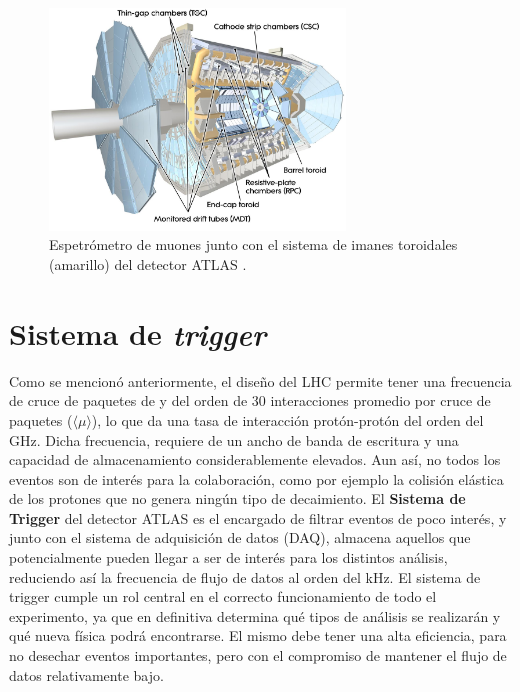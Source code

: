 \begin{figure}
  \centering
  \includegraphics[width=0.7\textwidth]{images/lhc/muon_1.jpg}
  \caption{Espetrómetro de muones junto con el sistema de imanes toroidales (amarillo) del detector ATLAS \cite{Pequenao:1095929}.}
  \label{fig:muon_1}
\end{figure}

\section{Sistema de \textit{trigger}}\label{sec:trigger}

Como se mencionó anteriormente, el diseño del LHC permite tener una frecuencia de cruce de paquetes de  y del orden de 30 interacciones promedio por cruce de paquetes ($\langle \mu \rangle$), lo que da una tasa de interacción protón-protón del orden del GHz. Dicha frecuencia, requiere de un ancho de banda de escritura y una capacidad de almacenamiento considerablemente elevados. Aun así, no todos los eventos son de interés para la colaboración, como por ejemplo la colisión elástica de los protones que no genera ningún tipo de decaimiento. El \textbf{Sistema de Trigger} del detector ATLAS \cite{TRIG-2016-01} es el encargado de filtrar eventos de poco interés, y junto con el sistema de adquisición de datos (DAQ), almacena aquellos que potencialmente pueden llegar a ser de interés para los distintos análisis, reduciendo así la frecuencia de flujo de datos al orden del kHz. El sistema de trigger cumple un rol central en el correcto funcionamiento de todo el experimento, ya que en definitiva determina qué tipos de análisis se realizarán y qué nueva física podrá encontrarse. El mismo debe tener una alta eficiencia, para no desechar eventos importantes, pero con el compromiso de mantener el flujo de datos relativamente bajo. 

